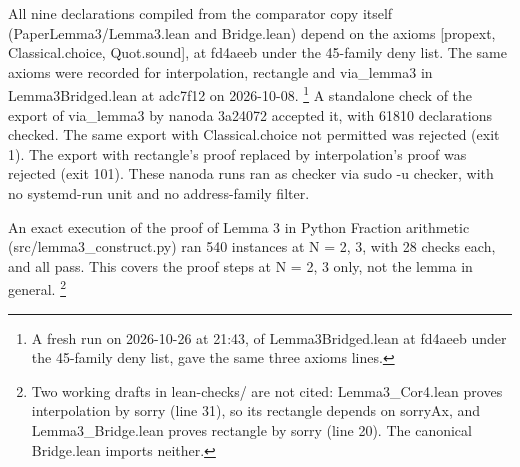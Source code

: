 All nine declarations compiled from the comparator copy itself (PaperLemma3/Lemma3.lean and Bridge.lean) depend on the axioms [propext, Classical.choice, Quot.sound], at fd4aeeb under the 45-family deny list.
The same axioms were recorded for interpolation, rectangle and via\_lemma3 in Lemma3Bridged.lean at adc7f12 on 2026-10-08.
\footnote{A fresh run on 2026-10-26 at 21:43, of Lemma3Bridged.lean at fd4aeeb under the 45-family deny list, gave the same three axioms lines.
}
A standalone check of the export of via\_lemma3 by nanoda 3a24072 accepted it, with 61810 declarations checked.
The same export with Classical.choice not permitted was rejected (exit 1).
The export with rectangle's proof replaced by interpolation's proof was rejected (exit 101).
These nanoda runs ran as checker via sudo -u checker, with no systemd-run unit and no address-family filter.

An exact execution of the proof of Lemma 3 in Python Fraction arithmetic (src/lemma3\_construct.py) ran 540 instances at N = 2, 3, with 28 checks each, and all pass.
This covers the proof steps at N = 2, 3 only, not the lemma in general.
\footnote{Two working drafts in lean-checks/ are not cited: Lemma3\_Cor4.lean proves interpolation by sorry (line 31), so its rectangle depends on sorryAx, and Lemma3\_Bridge.lean proves rectangle by sorry (line 20).
The canonical Bridge.lean imports neither.
}
